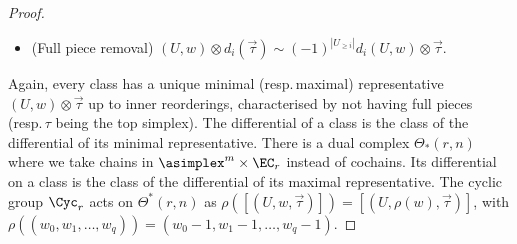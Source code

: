 \begin{proof}
\begin{itemize}
	\item (Full piece removal) $(U,w)\otimes d_i(\vec{\tau})\sim (-1)^{|U_{\ge i}|}d_i(U,w)\otimes \vec{\tau}$.
\end{itemize}
Again, every class has a unique minimal (resp.\,maximal) representative $(U,w)\otimes \vec{\tau}$ up to inner reorderings, characterised by not having full pieces (resp.\,$\tau$ being the top simplex). The differential of a class is the class of the differential of its minimal representative. There is a dual complex $\Theta_*(r,n)$ where we take chains in $\asimplex^m\times \EC_r$ instead of cochains. Its differential on a class is the class of the differential of its maximal representative. The cyclic group $\Cyc_r$ acts on $\Theta^*(r,n)$ as $\rho([(U,w,\vec{\tau})]) = [(U,\rho(w),\vec{\tau})]$, with $\rho((w_0,w_1,\ldots,w_q)) = (w_0-1,w_1-1,\ldots,w_q-1)$.



\end{proof}

